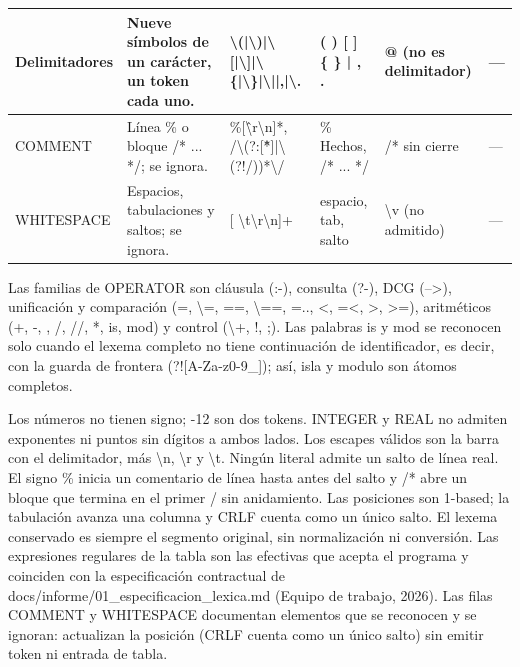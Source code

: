 \documentclass[11pt,letterpaper]{article}
\newcommand{\code}[1]{{\ttfamily\small #1}}
\newcommand{\bs}{\textbackslash}
\begin{document}
{\begin{tabularx}{\textwidth}{|l|>{\hsize}Y|>{\hsize}Y|>{\hsize}Y|>{\hsize}Y|l|}
  \hline
  Delimitadores & Nueve símbolos de un carácter, un token cada uno. & \code{\bs(|\allowbreak\bs)|\allowbreak\bs[|\allowbreak\bs]|\allowbreak\bs\{|\allowbreak\bs\}|\allowbreak\bs||\allowbreak,|\allowbreak\bs.} & \code{( ) [ ] \{ \} | , .} & \code{@} (no es delimitador) & — \\
  \hline
  \code{COMMENT} & Línea \code{\%} o bloque \code{/* ... */}; se ignora. & \code{\%[\^\bs r\bs n]*}, \code{/\bs*(?:[\^*]|\allowbreak\bs*(?!/))*\bs*/} & \code{\% Hechos}, \code{/* ... */} & \code{/* sin cierre} & — \\
  \hline
  \code{WHITESPACE} & Espacios, tabulaciones y saltos; se ignora. & \code{[ \bs t\bs r\bs n]+} & espacio, tab, salto & \code{\bs v} (no admitido) & — \\
  \hline
\end{tabularx}
}

Las familias de \code{OPERATOR} son cláusula (\code{:-}), consulta (\code{?-}), DCG (\code{-->}), unificación y comparación (\code{=}, \code{\textbackslash=}, \code{==}, \code{\textbackslash==}, \code{=..}, \code{<}, \code{=<}, \code{>}, \code{>=}), aritméticos (\code{+}, \code{-}, \code{*}, \code{/}, \code{//}, \code{**}, \code{is}, \code{mod}) y control (\code{\textbackslash+}, \code{!}, \code{;}). Las palabras \code{is} y \code{mod} se reconocen solo cuando el lexema completo no tiene continuación de identificador, es decir, con la guarda de frontera \code{(?![A-Za-z0-9\_])}; así, \code{isla} y \code{modulo} son átomos completos.

Los números no tienen signo; \code{-12} son dos tokens. \code{INTEGER} y \code{REAL} no admiten exponentes ni puntos sin dígitos a ambos lados. Los escapes válidos son la barra con el delimitador, más \code{\textbackslash n}, \code{\textbackslash r} y \code{\textbackslash t}. Ningún literal admite un salto de línea real. El signo \code{\%} inicia un comentario de línea hasta antes del salto y \code{/*} abre un bloque que termina en el primer \code{*/} sin anidamiento. Las posiciones son 1-based; la tabulación avanza una columna y \code{CRLF} cuenta como un único salto. El lexema conservado es siempre el segmento original, sin normalización ni conversión. Las expresiones regulares de la tabla son las efectivas que acepta el programa y coinciden con la especificación contractual de \code{docs/informe/01\_especificacion\_lexica.md} (Equipo de trabajo, 2026). Las filas \code{COMMENT} y \code{WHITESPACE} documentan elementos que se reconocen y se ignoran: actualizan la posición (\code{CRLF} cuenta como un único salto) sin emitir token ni entrada de tabla.
\end{document}
